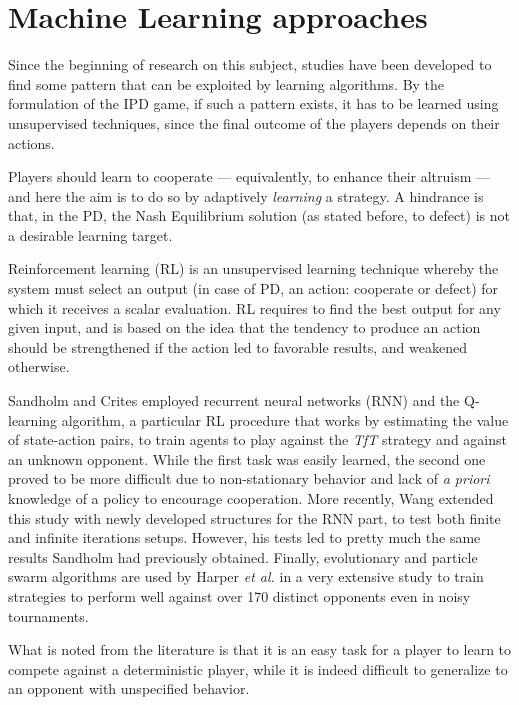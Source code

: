 \documentclass[journal,10pt,twoside]{IEEEtran}
\begin{document}
\section{Machine Learning approaches} \label{s:ml}
Since the beginning of research on this subject, studies have been developed to find some pattern that can be exploited by learning algorithms.
By the formulation of the IPD game, if such a pattern exists, it has to be learned using unsupervised techniques, since the final outcome of the players depends on their actions.

Players should learn to cooperate --- equivalently, to enhance their altruism --- and here the aim is to do so by adaptively \textit{learning} a strategy. A hindrance is that, in the PD, the Nash Equilibrium solution (as stated before, to defect) is not a desirable learning target.~\cite{coopSeqRL}

Reinforcement learning (RL) is an unsupervised learning technique whereby the system must select an output (in case of PD, an action: cooperate or defect) for which it receives a scalar evaluation. RL requires to find the best output for any given input, and is based on the idea that the tendency to produce an action should be strengthened if the action led to favorable results, and weakened otherwise.~\cite{sandholmRL}

Sandholm and Crites \cite{sandholmRL} employed recurrent neural networks (RNN) and the Q-learning algorithm, a particular RL procedure that works by estimating the value of state-action pairs, to train agents to play against the \textit{TfT} strategy and against an unknown opponent. While the first task was easily learned, the second one proved to be more difficult due to non-stationary behavior and lack of \textit{a priori} knowledge of a policy to encourage cooperation.
More recently, Wang \cite{kedaoRL} extended this study with newly developed structures for the RNN part, to test both finite and infinite iterations setups. However, his tests led to pretty much the same results Sandholm had previously obtained.
Finally, evolutionary and particle swarm algorithms are used by Harper \textit{et al.} in a very extensive study \cite{plosRLdominant} to train strategies to perform well against over 170 distinct opponents even in noisy tournaments.

What is noted from the literature is that it is an easy task for a player to learn to compete against a deterministic player, while it is indeed difficult to generalize to an opponent with unspecified behavior.
\end{document}
